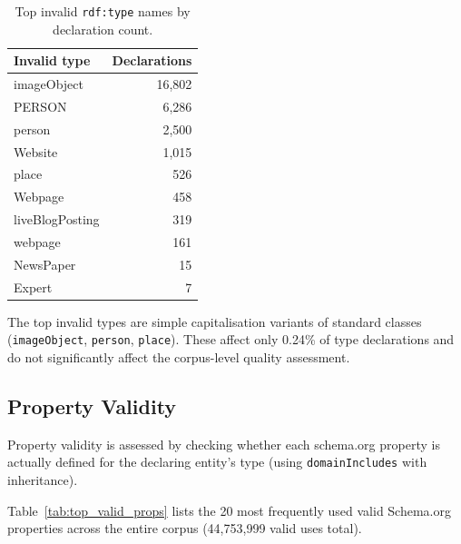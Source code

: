 \documentclass[11pt,a4paper]{article}
\begin{document}
\begin{table}[H]
\centering
\caption{Top invalid \texttt{rdf:type} names by declaration count.}
\label{tab:invalid_types}
\begin{tabular}{lr}
\toprule
\textbf{Invalid type} & \textbf{Declarations} \\
\midrule
imageObject          & 16{,}802 \\
PERSON               &  6{,}286 \\
person               &  2{,}500 \\
Website              &  1{,}015 \\
place                &    526 \\
Webpage              &    458 \\
liveBlogPosting      &    319 \\
webpage              &    161 \\
NewsPaper            &     15 \\
Expert               &      7 \\
\bottomrule
\end{tabular}
\end{table}

The top invalid types are simple capitalisation variants of standard classes
(\texttt{imageObject}, \texttt{person}, \texttt{place}). These affect only 0.24\% of type declarations and do not significantly affect the corpus-level quality assessment.

\subsection{Property Validity}

Property validity is assessed by checking whether each schema.org property is
actually defined for the declaring entity's type (using \texttt{domainIncludes}
with inheritance).

Table~\ref{tab:top_valid_props} lists the 20 most frequently used valid
Schema.org properties across the entire corpus (44{,}753{,}999 valid uses total).
\end{document}
